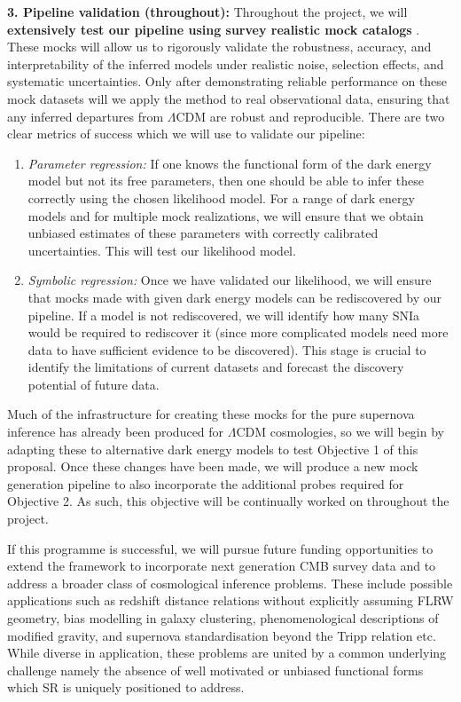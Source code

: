\documentclass[11pt]{article}
\newcommand{\db}[1]{{\color{purple}[DJB: #1]}}
\begin{document}
\textbf{3. Pipeline validation (throughout):} Throughout the project, we will \textbf{extensively test our pipeline using survey realistic mock catalogs} \citep{Mitra_2023,Mitra_2025}. These mocks will allow us to rigorously validate the robustness, accuracy, and interpretability of the inferred models under realistic noise, selection effects, and systematic uncertainties. Only after demonstrating reliable performance on these mock datasets will we apply the method to real observational data, ensuring that any inferred departures from $\Lambda$CDM are robust and reproducible.
There are two clear metrics of success which we will use to validate our pipeline:
\begin{enumerate}[
    topsep=0pt,
    partopsep=0pt,
    parsep=0pt,
    itemsep=0pt,
    label=\alph*)]
    \item \textit{Parameter regression:} If one knows the functional form of the dark energy model but not its free parameters, then one should be able to infer these correctly using the chosen likelihood model. For a range of dark energy models and for multiple mock realizations, we will ensure that we obtain unbiased estimates of these parameters with correctly calibrated uncertainties. This will test our likelihood model.
    \item \textit{Symbolic regression:} Once we have validated our likelihood, we will ensure that mocks made with given dark energy models can be rediscovered by our pipeline. If a model is not rediscovered, we will identify how many SNIa would be required to rediscover it (since more complicated models need more data to have sufficient evidence to be discovered). This stage is crucial to identify the limitations of current datasets and forecast the discovery potential of future data.
\end{enumerate}
Much of the infrastructure for creating these mocks for the pure supernova inference has already been produced  \citep{Mitra_2023,Mitra_2025} for $\Lambda$CDM cosmologies, so we will begin by adapting these to alternative dark energy models to test Objective 1 of this proposal.
Once these changes have been made, we will produce a new mock generation pipeline to also incorporate the additional probes required for Objective 2. As such, this objective will be continually worked on throughout the project. 


If this programme is successful, we will pursue future funding opportunities to extend the framework to incorporate next generation CMB survey data and to address a broader class of cosmological inference problems. These include possible applications such as redshift distance relations without explicitly assuming FLRW geometry, bias modelling in galaxy clustering, phenomenological descriptions of modified gravity, and supernova standardisation beyond the Tripp relation etc. While diverse in application, these problems are united by a common underlying challenge namely the absence of well motivated or unbiased functional forms which SR is uniquely positioned to address.
\end{document}
